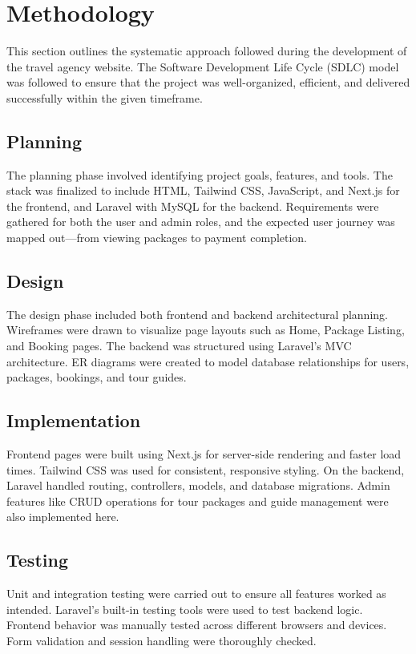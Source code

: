 \section{Methodology}
This section outlines the systematic approach followed during the development of the travel agency website. The Software Development Life Cycle (SDLC) model was followed to ensure that the project was well-organized, efficient, and delivered successfully within the given timeframe.

\subsection{Planning}
The planning phase involved identifying project goals, features, and tools. The stack was finalized to include HTML, Tailwind CSS, JavaScript, and Next.js for the frontend, and Laravel with MySQL for the backend. Requirements were gathered for both the user and admin roles, and the expected user journey was mapped out—from viewing packages to payment completion.

\subsection{Design}
The design phase included both frontend and backend architectural planning. Wireframes were drawn to visualize page layouts such as Home, Package Listing, and Booking pages. The backend was structured using Laravel's MVC architecture. ER diagrams were created to model database relationships for users, packages, bookings, and tour guides.

\subsection{Implementation}
Frontend pages were built using Next.js for server-side rendering and faster load times. Tailwind CSS was used for consistent, responsive styling. On the backend, Laravel handled routing, controllers, models, and database migrations. Admin features like CRUD operations for tour packages and guide management were also implemented here.

\subsection{Testing}
Unit and integration testing were carried out to ensure all features worked as intended. Laravel’s built-in testing tools were used to test backend logic. Frontend behavior was manually tested across different browsers and devices. Form validation and session handling were thoroughly checked.

